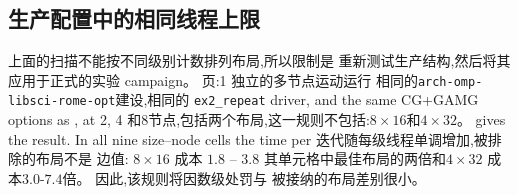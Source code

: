 \documentclass[11pt,a4paper,oneside]{report}
\let\OldSubsection\subsection
\renewcommand{\subsection}{\FloatBarrier\OldSubsection}
\begin{document}
\subsection{生产配置中的相同线程上限}
\label{sec:sweep-production}
上面的扫描不能按不同级别计数排列布局,所以限制是
重新测试生产结构,然后将其应用于正式的实验 campaign。 页:1
独立的多节点运动运行 相同的\texttt{arch-omp-libsci-rome-opt}建设,相同的
\texttt{ex2\_repeat} driver, and the same CG+GAMG options as , at 2, 4
和8节点,包括两个布局,这一规则不包括:$8\times16$和$4\times32$。
 gives the result. In all nine size--node cells the time per
迭代随每级线程单调增加,被排除的布局不是
边值: $8\times16$ 成本 $1.8$ -- $3.8$ 其单元格中最佳布局的两倍和$4\times32$
成本$3.0$-$7.4$倍。 因此,该规则将因数级处罚与
被接纳的布局差别很小。
\end{document}
